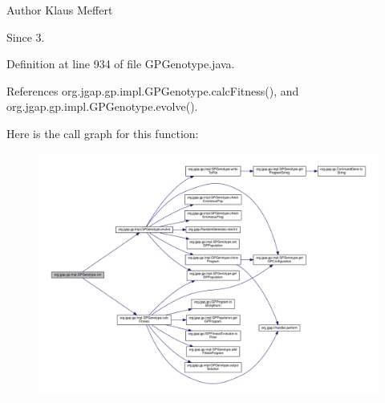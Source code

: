 \begin{DoxyAuthor}{Author}
Klaus Meffert 
\end{DoxyAuthor}
\begin{DoxySince}{Since}
3. 
\end{DoxySince}


Definition at line 934 of file G\-P\-Genotype.\-java.



References org.\-jgap.\-gp.\-impl.\-G\-P\-Genotype.\-calc\-Fitness(), and org.\-jgap.\-gp.\-impl.\-G\-P\-Genotype.\-evolve().



Here is the call graph for this function\-:
\nopagebreak
\begin{figure}[H]
\begin{center}
\leavevmode
\includegraphics[width=350pt]{classorg_1_1jgap_1_1gp_1_1impl_1_1_g_p_genotype_a184964a4fc96748de13cad57bee24ad0_cgraph}
\end{center}
\end{figure}


